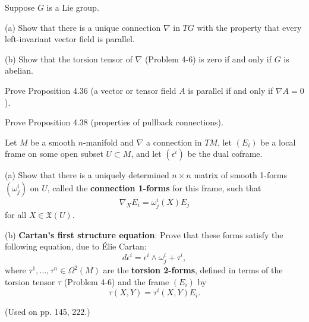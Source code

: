 \begin{exercise}
\label{prob:lie-group-connection}
Suppose $G$ is a Lie group.

(a) Show that there is a unique connection $\nabla$ in $TG$ with the property that every left-invariant vector field is parallel.

(b) Show that the torsion tensor of $\nabla$ (Problem 4-6) is zero if and only if $G$ is abelian.
\end{exercise}

\begin{exercise}
\label{prob:parallel-tensor-fields}
Prove Proposition 4.36 (a vector or tensor field $A$ is parallel if and only if $\nabla A = 0$).
\end{exercise}

\begin{exercise}
\label{prob:pullback-connections}
Prove Proposition 4.38 (properties of pullback connections).
\end{exercise}

\begin{exercise}
\label{prob:connection-1forms-cartan}
Let $M$ be a smooth $n$-manifold and $\nabla$ a connection in $TM$, let $(E_i)$ be a local frame on some open subset $U \subset M$, and let $(\epsilon^i)$ be the dual coframe.

(a) Show that there is a uniquely determined $n \times n$ matrix of smooth 1-forms $(\omega^i_j)$ on $U$, called the \textbf{connection 1-forms} for this frame, such that
\[
\nabla_X E_i = \omega^i_j(X) E_j
\]
for all $X \in \mathfrak{X}(U)$.

(b) \textbf{Cartan's first structure equation}: Prove that these forms satisfy the following equation, due to \'Elie Cartan:
\[
d\epsilon^i = \epsilon^i \wedge \omega^i_j + \tau^i,
\]
where $\tau^1, \ldots, \tau^n \in \Omega^2(M)$ are the \textbf{torsion 2-forms}, defined in terms of the torsion tensor $\tau$ (Problem 4-6) and the frame $(E_i)$ by
\[
\tau(X,Y) = \tau^i(X,Y) E_i.
\]

(Used on pp. 145, 222.)
\end{exercise}
